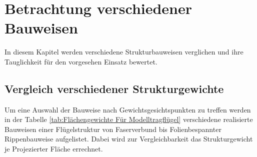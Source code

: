 \chapter{Betrachtung verschiedener Bauweisen}\label{cha:Statistische Betrachtung bisheriger Bauformen}

In diesem Kapitel werden verschiedene Strukturbauweisen verglichen und ihre Tauglichkeit für den vorgesehen Einsatz bewertet.

\section{Vergleich verschiedener Strukturgewichte}

Um eine Auswahl der Bauweise nach Gewichtsgesichtspunkten zu treffen werden in der Tabelle \ref{tab:Flächengewichte Für Modelltragflügel} verschiedene realisierte Bauweisen einer Flügelstruktur von Faserverbund bis Folienbespannter Rippenbauweise aufgelistet. Dabei wird zur Vergleichbarkeit das Strukturgewicht je Projezierter Fläche errechnet.

